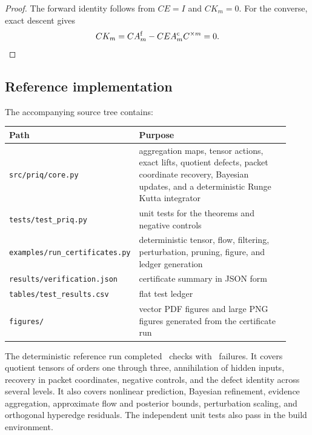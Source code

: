 \begin{proof}
The forward identity follows from $CE=I$ and $CK_m=0$.  For the converse, exact descent gives
\[
  CK_m
  =CA_m^{\mathrm f}-CEA_m^{\mathrm c}C^{\times m}=0.
\]
\end{proof}

\subsection{Reference implementation}
The accompanying source tree contains:
\begin{center}
\small
\begin{tabular}{@{}p{0.31\linewidth}p{0.61\linewidth}@{}}
\toprule
Path & Purpose\\
\midrule
\texttt{src/priq/core.py} & aggregation maps, tensor actions, exact lifts, quotient defects, packet coordinate recovery, Bayesian updates, and a deterministic Runge Kutta integrator\\
\texttt{tests/test\_priq.py} & unit tests for the theorems and negative controls\\
\texttt{examples/}\allowbreak\texttt{run\_certificates.py} & deterministic tensor, flow, filtering, perturbation, pruning, figure, and ledger generation\\
\texttt{results/verification.json} & certificate summary in JSON form\\
\texttt{tables/test\_results.csv} & flat test ledger\\
\texttt{figures/} & vector PDF figures and large PNG figures generated from the certificate run\\
\bottomrule
\end{tabular}
\end{center}

\begin{PRIQcertificate}\label{PRIQ:cert:executed-suite}
The deterministic reference run completed \VerificationPassCount\ checks with \VerificationFailCount\ failures.  It covers quotient tensors of orders one through three, annihilation of hidden inputs, recovery in packet coordinates, negative controls, and the defect identity across several levels.  It also covers nonlinear prediction, Bayesian refinement, evidence aggregation, approximate flow and posterior bounds, perturbation scaling, and orthogonal hyperedge residuals.  The independent unit tests also pass in the build environment.
\end{PRIQcertificate}


